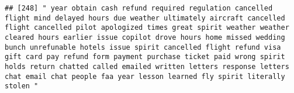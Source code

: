 \documentclass[
]{article}
\begin{document}
\begin{verbatim}
## [248] " year obtain cash refund required regulation cancelled flight mind delayed hours due weather ultimately aircraft cancelled flight cancelled pilot apologized times great spirit weather weather cleared hours earlier issue copilot drove hours home missed wedding bunch unrefunable hotels issue spirit cancelled flight refund visa gift card pay refund form payment purchase ticket paid wrong spirit holds return chatted called emailed written letters response letters chat email chat people faa year lesson learned fly spirit literally stolen "                                                                                                                                                                                                                                                                                                                                                                                                                                                                                                                                                                                                                                                                                                                                                                                                                                                                                                                                                                                                                                                                                                                                                                                                                                   

\end{verbatim}
\end{document}
